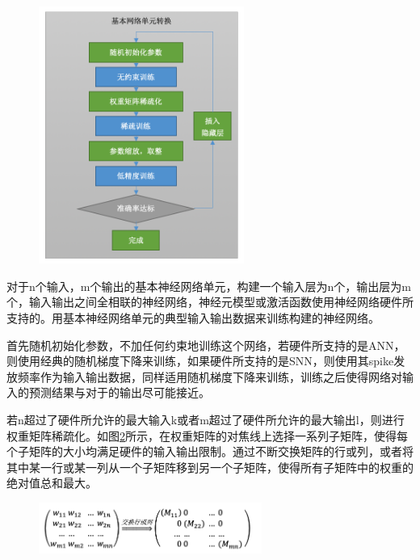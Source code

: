 \begin{itemize}
    \begin{figure}[!htbp]
    \centering
    \includegraphics[width=0.60\textwidth]{Img/Chap_Application/Zhang/NNUintExchange.png}
    \label{fig:NNUintExchange}
    \end{figure}

    对于n个输入，m个输出的基本神经网络单元，构建一个输入层为n个，输出层为m个，输入输出之间全相联的神经网络，神经元模型或激活函数使用神经网络硬件所支持的。用基本神经网络单元的典型输入输出数据来训练构建的神经网络。
    
    首先随机初始化参数，不加任何约束地训练这个网络，若硬件所支持的是ANN，则使用经典的随机梯度下降来训练，如果硬件所支持的是SNN，则使用其spike发放频率作为输入输出数据，同样适用随机梯度下降来训练，训练之后使得网络对输入的预测结果与对于的输出尽可能接近。
    
    若n超过了硬件所允许的最大输入k或者m超过了硬件所允许的最大输出l，则进行权重矩阵稀疏化。如图\ref{fig:matrix}所示，在权重矩阵的对焦线上选择一系列子矩阵，使得每个子矩阵的大小均满足硬件的输入输出限制。通过不断交换矩阵的行或列，或者将其中某一行或某一列从一个子矩阵移到另一个子矩阵，使得所有子矩阵中的权重的绝对值总和最大。
    
    \begin{figure}[!htbp]
    \centering
    \includegraphics[width=0.65\textwidth]{Img/Chap_Application/Zhang/matrix.png}
    \label{fig:matrix}
    \end{figure}
    

\end{itemize}
